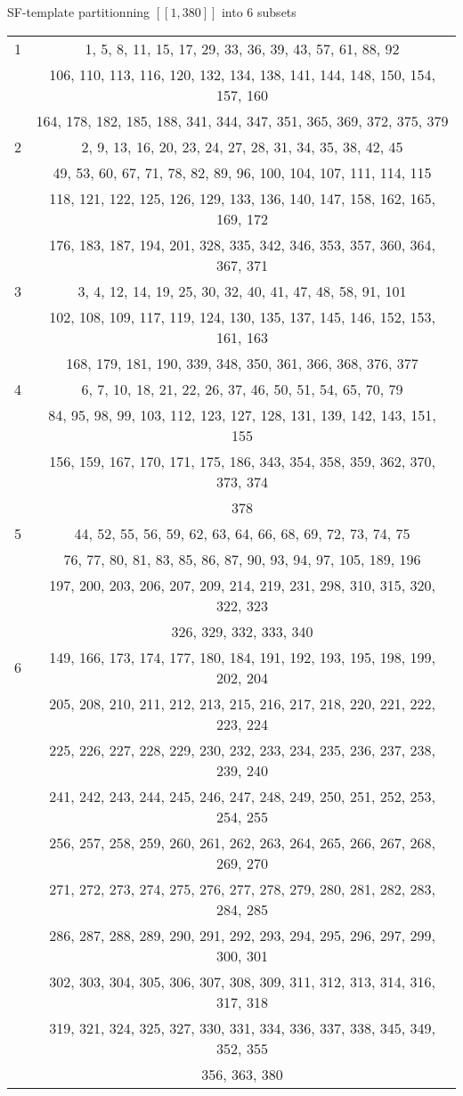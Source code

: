 \begin{center}
SF-template partitionning \([\![1, 380]\!]\) into 6 subsets
\begin{tabular}{|*{2}{c|}}
	\hline
	1 & 1, 5, 8, 11, 15, 17, 29, 33, 36, 39, 43, 57, 61, 88, 92 \\
	& 106, 110, 113, 116, 120, 132, 134, 138, 141, 144, 148, 150, 154, 157, 160 \\
	& 164, 178, 182, 185, 188, 341, 344, 347, 351, 365, 369, 372, 375, 379\\
	\hline
	2 & 2, 9, 13, 16, 20, 23, 24, 27, 28, 31, 34, 35, 38, 42, 45\\
	& 49, 53, 60, 67, 71, 78, 82, 89, 96, 100, 104, 107, 111, 114, 115\\
	& 118, 121, 122, 125, 126, 129, 133, 136, 140, 147, 158, 162, 165, 169, 172\\
	& 176, 183, 187, 194, 201, 328, 335, 342, 346, 353, 357, 360, 364, 367, 371\\
	\hline
	3 & 3, 4, 12, 14, 19, 25, 30, 32, 40, 41, 47, 48, 58, 91, 101\\
	& 102, 108, 109, 117, 119, 124, 130, 135, 137, 145, 146, 152, 153, 161, 163\\
	& 168, 179, 181, 190, 339, 348, 350, 361, 366, 368, 376, 377\\
	\hline
	4 & 6, 7, 10, 18, 21, 22, 26, 37, 46, 50, 51, 54, 65, 70, 79\\
	& 84, 95, 98, 99, 103, 112, 123, 127, 128, 131, 139, 142, 143, 151, 155\\
	& 156, 159, 167, 170, 171, 175, 186, 343, 354, 358, 359, 362, 370, 373, 374\\
	& 378\\
	\hline
	5 & 44, 52, 55, 56, 59, 62, 63, 64, 66, 68, 69, 72, 73, 74, 75\\
	& 76, 77, 80, 81, 83, 85, 86, 87, 90, 93, 94, 97, 105, 189, 196\\
	& 197, 200, 203, 206, 207, 209, 214, 219, 231, 298, 310, 315, 320, 322, 323\\
	& 326, 329, 332, 333, 340\\
	\hline
	6 & 149, 166, 173, 174, 177, 180, 184, 191, 192, 193, 195, 198, 199, 202, 204\\
	& 205, 208, 210, 211, 212, 213, 215, 216, 217, 218, 220, 221, 222, 223, 224\\
	& 225, 226, 227, 228, 229, 230, 232, 233, 234, 235, 236, 237, 238, 239, 240\\
	& 241, 242, 243, 244, 245, 246, 247, 248, 249, 250, 251, 252, 253, 254, 255\\
	& 256, 257, 258, 259, 260, 261, 262, 263, 264, 265, 266, 267, 268, 269, 270\\
	& 271, 272, 273, 274, 275, 276, 277, 278, 279, 280, 281, 282, 283, 284, 285\\
	& 286, 287, 288, 289, 290, 291, 292, 293, 294, 295, 296, 297, 299, 300, 301\\
	& 302, 303, 304, 305, 306, 307, 308, 309, 311, 312, 313, 314, 316, 317, 318\\
	& 319, 321, 324, 325, 327, 330, 331, 334, 336, 337, 338, 345, 349, 352, 355\\
	& 356, 363, 380\\
	\hline


\end{tabular}
\end{center}
